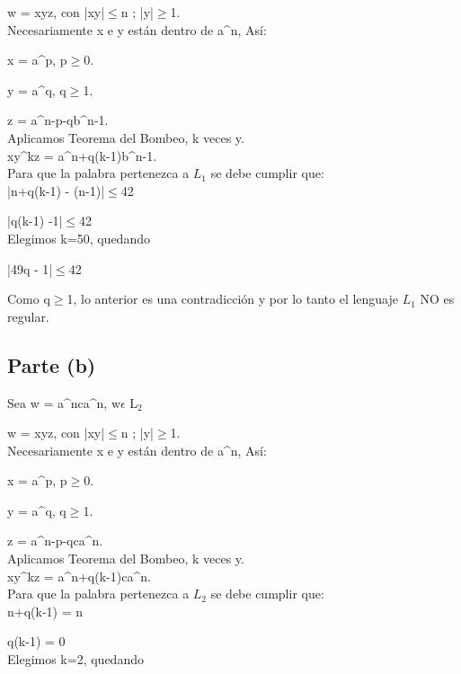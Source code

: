 \documentclass[11pt,letterpaper]{article}
\begin{document}
w = xyz, con |xy|$\leqslant$n ; |y|$\geqslant$1.
 \\

Necesariamente x e y están dentro de a^n, As$í$:

x = a^p, p$\geqslant$0.

y = a^q, q$\geqslant$1.

z = a^{n-p-q}b^{n-1}.
 \\

Aplicamos Teorema del Bombeo, k veces y.
 \\
 
xy^kz = a^{n+q(k-1)}b^{n-1}.
 \\

Para que la palabra pertenezca a $L_{1}$ se debe cumplir que:
 \\
 
|n+q(k-1) - (n-1)|$\leqslant$42

|q(k-1) -1|$\leqslant$42
 \\
 
Elegimos k=50, quedando

|49q - 1|$\leqslant$42

Como q$\geqslant$1, lo anterior es una contradicción y por lo tanto el lenguaje $L_{1}$ NO es regular.


\subsection{Parte (b)}
Sea w = a^nca^n, w$ \epsilon $ L$_{2}$

w = xyz, con |xy|$\leqslant$n ; |y|$\geqslant$1.
 \\

Necesariamente x e y están dentro de a^n, As$í$:

x = a^p, p$\geqslant$0.

y = a^q, q$\geqslant$1.

z = a^{n-p-q}ca^n.
 \\

Aplicamos Teorema del Bombeo, k veces y.
 \\
 
xy^kz = a^{n+q(k-1)}ca^n.
 \\

Para que la palabra pertenezca a $L_{2}$ se debe cumplir que:
 \\
 
n+q(k-1) = n

q(k-1) = 0
 \\
 
Elegimos k=2, quedando
\end{document}
